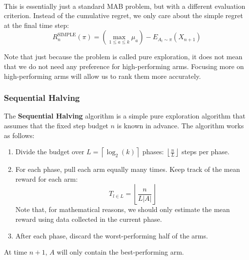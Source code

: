 \documentclass[12pt]{article}
\begin{document}
\noindent
\\
This is essentially just a standard MAB problem, but with a different evaluation criterion.
Instead of the cumulative regret, we only care about the simple regret at the final time step:
\[ R_n^{\text{SIMPLE}}(\pi) = \left( \max_{1 \leq a \leq k} \mu_a \right) - E_{A_t \sim \pi}(X_{n + 1}) \]

\noindent
Note that just because the problem is called pure exploration, it does not mean that we do not need any preference for high-performing arms.
Focusing more on high-performing arms will allow us to rank them more accurately.

\subsubsection{Sequential Halving}
The \textbf{Sequential Halving} algorithm is a simple pure exploration algorithm that assumes that the fixed step budget $n$ is known in advance.
The algorithm works as follows:

\begin{enumerate}
    \item Divide the budget over $L = \left\lceil \log_2(k) \right\rceil$ phases: $\left\lfloor \frac{n}{L} \right\rfloor$ steps per phase.
    \item For each phase, pull each arm equally many times. Keep track of the mean reward for each arm:
    \[ T_{l \in L} = \left\lfloor \frac{n}{L |A|} \right\rfloor \]
    Note that, for mathematical reasons, we should only estimate the mean reward using data collected in the current phase.
    \item After each phase, discard the worst-performing half of the arms.
\end{enumerate}

\noindent
At time $n + 1$, $A$ will only contain the best-performing arm.
\end{document}
